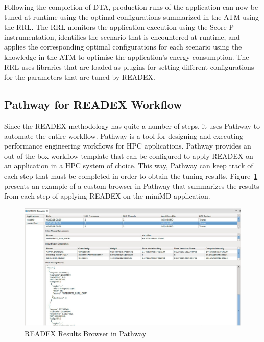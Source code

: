 Following the completion of DTA, production runs of the application can now be tuned at runtime using the optimal configurations summarized in the ATM using the RRL. The RRL monitors the application execution using the Score-P instrumentation, identifies the scenario that is encountered at runtime, and applies the corresponding optimal configurations for each scenario using the knowledge in the ATM to optimise the application's energy consumption. The RRL uses libraries that are loaded as plugins for setting different configurations for the parameters that are tuned by READEX.

\subsection{Pathway for READEX Workflow}
\label{sec:pathway_for_readex_workflow}

Since the READEX methodology has quite a number of steps, it uses Pathway to automate the entire workflow. Pathway \cite{Pathway:Petkov13} is a tool for designing and executing performance engineering workflows for HPC applications. Pathway provides an out-of-the box workflow template that can be configured to apply READEX on an application in a HPC system of choice. This way, Pathway can keep track of each step that must be completed in order to obtain the tuning results. Figure~\ref{fig:pathway_browser} presents an example of a custom browser in Pathway that summarizes the results from each step of applying READEX on the miniMD application. 


\begin{figure}[!t]
\centering
\includegraphics[width=.95\columnwidth]{figures/PathwayBrowser.jpeg}
\caption{READEX Results Browser in Pathway}
\label{fig:pathway_browser}
\end{figure}
